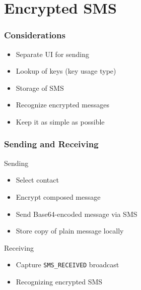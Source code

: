 \documentclass{beamer}
\begin{document}
\section{Encrypted SMS}
	\begin{frame}
		\tableofcontents[currentsection]
	\end{frame}
	\begin{frame}
	\frametitle{Considerations}
		\begin{itemize}
			\item Separate UI for sending
			\item Lookup of keys (key usage type)
			\item Storage of SMS %
			\item Recognize encrypted messages
			\item Keep it as simple as possible %
		\end{itemize}
	\end{frame}
	\begin{frame}
	\frametitle{Sending and Receiving}
		\begin{block}{Sending}
			\begin{itemize}
				\item Select contact
				\item Encrypt composed message
				\item Send Base64-encoded message via SMS
				\item Store copy of plain message locally
			\end{itemize}
		\end{block}
		\begin{block}{Receiving}
			\begin{itemize}
				\item Capture {\tt SMS\_RECEIVED} broadcast
				\item Recognizing encrypted SMS
			\end{itemize}
		\end{block}
	\end{frame}
\end{document}
